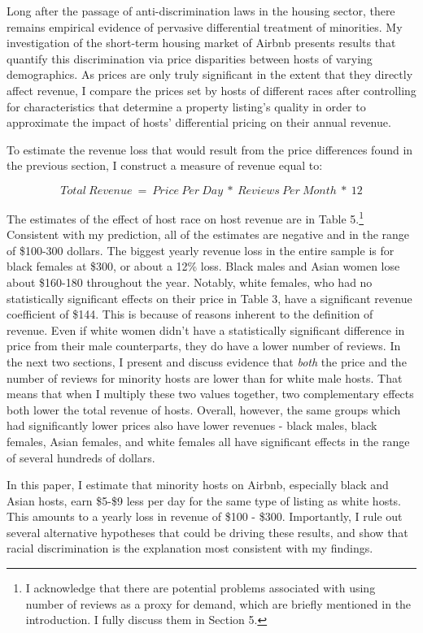
Long after the passage of anti-discrimination laws in the housing sector, there remains empirical evidence of pervasive differential treatment of minorities. My investigation of the short-term housing market of Airbnb presents results that quantify this discrimination via price disparities between hosts of varying demographics. As prices are only truly significant in the extent that they directly affect revenue, I compare the prices set by hosts of different races after controlling for characteristics that determine a property listing's quality in order to approximate the impact of hosts' differential pricing on their annual revenue.

To estimate the revenue loss that would result from the price differences found in the previous section, I construct a measure of revenue equal to: 

\[Total \: Revenue \ = \ Price \: Per \: Day \ * \ Reviews \: Per \: Month \ * \ 12\] 

The estimates of the effect of host race on host revenue are in Table 5.\footnote{I acknowledge that there are potential problems associated with using number of reviews as a proxy for demand, which are briefly mentioned in the introduction. I fully discuss them in Section 5.} Consistent with my prediction, all of the estimates are negative and in the range of \$100-300 dollars. The biggest yearly revenue loss in the entire sample is for black females at \$300, or about a 12\% loss. Black males and Asian women lose about \$160-180 throughout the year. Notably, white females, who had no statistically significant effects on their price in Table 3, have a significant revenue coefficient of \$144. This is because of reasons inherent to the definition of revenue. Even if white women didn't have a statistically significant difference in price from their male counterparts, they do have a lower number of reviews. In the next two sections, I present and discuss evidence that \textit{both} the price and the number of reviews for minority hosts are lower than for white male hosts. That means that when I multiply these two values together, two complementary effects both lower the total revenue of hosts. Overall, however, the same groups which had significantly lower prices also have lower revenues - black males, black females, Asian females, and white females all have significant effects in the range of several hundreds of dollars. 


In this paper, I estimate that minority hosts on Airbnb, especially black and Asian hosts, earn \$5-\$9 less per day for the same type of listing as white hosts. This amounts to a yearly loss in revenue of \$100 - \$300. Importantly, I rule out several alternative hypotheses that could be driving these results, and show that racial discrimination is the explanation most consistent with my findings. 

